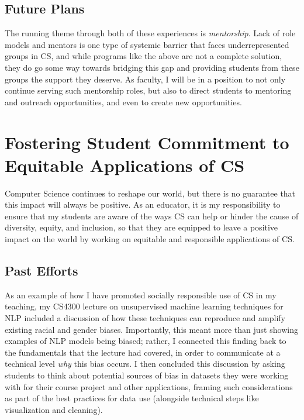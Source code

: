 \documentclass[12pt,letterpaper]{article}
\begin{document}
\subsection{Future Plans}
The running theme through both of these experiences is \emph{mentorship}.
Lack of role models and mentors is one type of systemic barrier that faces underrepresented groups in CS, and while programs like the above are not a complete solution, they do go some way towards bridging this gap and providing students from these groups the support they deserve.
As faculty, I will be in a position to not only continue serving such mentorship roles, but also to direct students to mentoring and outreach opportunities, and even to create new opportunities.
\deioutreach

\section{Fostering Student Commitment to Equitable Applications of CS}
Computer Science continues to reshape our world, but there is no guarantee that this impact will always be positive.
As an educator, it is my responsibility to ensure that my students are aware of the ways CS can help or hinder the cause of diversity, equity, and inclusion, so that they are equipped to leave a positive impact on the world by working on equitable and responsible applications of CS.

\subsection{Past Efforts}
As an example of how I have promoted socially responsible use of CS in my teaching, my CS4300 lecture on unsupervised machine learning techniques for NLP included a discussion of how these techniques can reproduce and amplify existing racial and gender biases.
Importantly, this meant more than just showing examples of NLP models being biased; rather, I connected this finding back to the fundamentals that the lecture had covered, in order to communicate at a technical level \emph{why} this bias occurs.
I then concluded this discussion by asking students to think about potential sources of bias in datasets they were working with for their course project and other applications, framing such considerations as part of the best practices for data use (alongside technical steps like visualization and cleaning).
\end{document}
